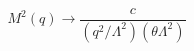 \begin{equation}\label{trentadue}
M^2(q) \rightarrow \frac {c}{(q^2/\Lambda^2)(\theta\Lambda^2)} 
\end{equation}

